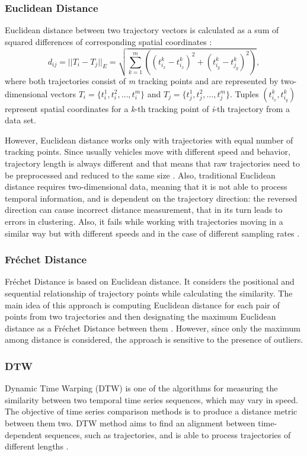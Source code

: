 \subsubsection{Euclidean Distance}
Euclidean distance between two trajectory vectors is calculated as a sum of squared differences of corresponding spatial coordinates \cite{article:27_vna_cad_td}:
\begin{equation}
	 d_{ij} = ||T_i - T_j||_E = \sqrt{\sum_{k=1}^{m}((t_{i_x}^k - t_{i_x}^k)^2 + (t_{i_y}^k - t_{j_y}^k)^2)},
\end{equation}
where both trajectories consist of \textit{m} tracking points and are represented by two-dimensional vectors $T_i = \{t_i^1, t_i^2, \ldots, t_i^m\}$ and $T_j = \{t_j^1, t_j^2, \ldots, t_j^m\}$. Tuples $(t_{i_x}^k, t_{i_y}^k)$ represent spatial coordinates for a \textit{k}-th tracking point of \textit{i}-th trajectory from a data set.

However, Euclidean distance works only with trajectories with equal number of tracking points. Since usually vehicles move with different speed and behavior, trajectory length is always different and that means that raw trajectories need to be preprocessed and reduced to the same size \cite{inproceedings:7_related_work}. Also, traditional Euclidean distance requires two-dimensional data, meaning that it is not able to process temporal information, and is dependent on the trajectory direction: the reversed direction can cause incorrect distance measurement, that in its turn leads to errors in clustering. Also, it fails while working with trajectories moving in a similar way but with different speeds and in the case of different sampling rates \cite{inproceedings:28_lcss_dsmt}.

\subsubsection{Fréchet Distance}
Fréchet Distance is based on Euclidean distance. It considers the positional and sequential relationship of trajectory points while calculating the similarity. The main idea of this approach is computing Euclidean distance for each pair of points from two trajectories and then designating the maximum Euclidean distance as a Fréchet Distance between them \cite{article:8_review_mot_cl_alg}\cite{inproceedings:29_fr_dist}. However, since only the maximum among distance is considered, the approach is sensitive to the presence of outliers.

\subsubsection{DTW}
Dynamic Time Warping (DTW) is one of the algorithms for measuring the similarity between two temporal time series sequences, which may vary in speed. The objective of time series comparison methods is to produce a distance metric between them two. DTW method aims to find an alignment between time-dependent sequences, such as trajectories, and is able to process trajectories of different lengths \cite{article:8_review_mot_cl_alg}. 

